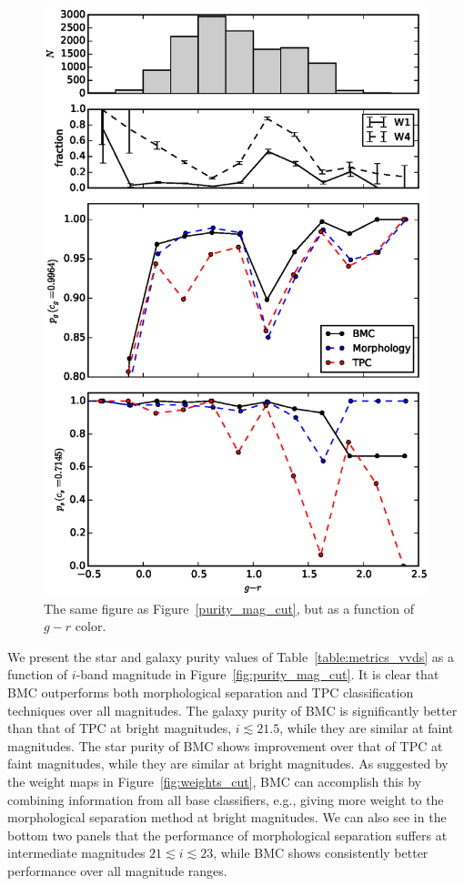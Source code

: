 \documentclass[useAMS,usenatbib]{mn2e}
\newcommand{\eg}{{e.g., }}
\begin{document}
\begin{figure}
  \centering
  \includegraphics[width=\linewidth]{figures/purity_g-r_cut.eps}
  \caption{The same figure as Figure~\ref{purity_mag_cut},
           but as a function of $g-r$ color.}
  \label{fig:purity_g-r_cut}
\end{figure}


We present the star and galaxy purity values
of Table~\ref{table:metrics_vvds} as a function of
$i$-band magnitude in Figure~\ref{fig:purity_mag_cut}.
It is clear that BMC outperforms both
morphological separation and TPC classification techniques
over all magnitudes.
The galaxy purity of BMC is significantly better
than that of TPC at bright magnitudes, $i\lesssim21.5$,
while they are similar at faint magnitudes.
The star purity of BMC shows improvement over that of TPC
at faint magnitudes,
while they are similar at bright magnitudes.
As suggested by the weight maps in Figure~\ref{fig:weights_cut},
BMC can accomplish this by combining information from
all base classifiers,
\eg giving more weight to the morphological separation method
at bright magnitudes.
We can also see in the bottom two panels that
the performance of morphological separation suffers
at intermediate magnitudes $21\lesssim i \lesssim23$,
while BMC shows consistently better performance
over all magnitude ranges.
\end{document}

